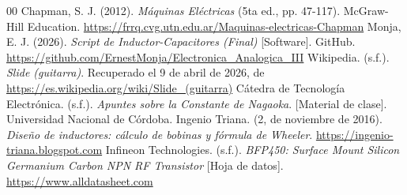 \documentclass[conference]{IEEEtran}
\begin{document}
\begin{thebibliography}{00}
     Chapman, S. J. (2012). \textit{Máquinas Eléctricas} (5ta ed., pp. 47-117). McGraw-Hill Education. \href{https://frrq.cvg.utn.edu.ar/pluginfile.php/20762/mod_resource/content/1/Maquinas-electricas-Chapman-5ta-edicion-pdf.pdf}{https://frrq.cvg.utn.edu.ar/Maquinas-electricas-Chapman}
     Monja, E. J. (2026). \textit{Script de Inductor-Capacitores (Final)} [Software]. GitHub. \href{https://github.com/ErnestMonja/Electronica_Analogica_III/blob/main/Trabajo%20Pr%C3%A1ctico%20N%C2%B01%20-%20Circuitos%20Sintonizados/TP1%20-%20Script%20de%20Inductor-Capacitores%20(Final).ipynb}{https://github.com/ErnestMonja/Electronica\_Analogica\_III}
     Wikipedia. (s.f.). \textit{Slide (guitarra)}. Recuperado el 9 de abril de 2026, de \href{https://es.wikipedia.org/wiki/Slide_(guitarra)}{https://es.wikipedia.org/wiki/Slide\_(guitarra)}
     Cátedra de Tecnología Electrónica. (s.f.). \textit{Apuntes sobre la Constante de Nagaoka}. [Material de clase]. Universidad Nacional de Córdoba.
     Ingenio Triana. (2, de noviembre de 2016). \textit{Diseño de inductores: cálculo de bobinas y fórmula de Wheeler}. \href{https://ingenio-triana.blogspot.com/2016/11/diseno-de-inductores-calculo-de-bobinas_2.html}{https://ingenio-triana.blogspot.com}
     Infineon Technologies. (s.f.). \textit{BFP450: Surface Mount Silicon Germanium Carbon NPN RF Transistor} [Hoja de datos]. \href{https://www.alldatasheet.com/datasheet-pdf/view/415897/INFINEON/BFP450_10.html}{https://www.alldatasheet.com}
\end{thebibliography}
\end{document}
